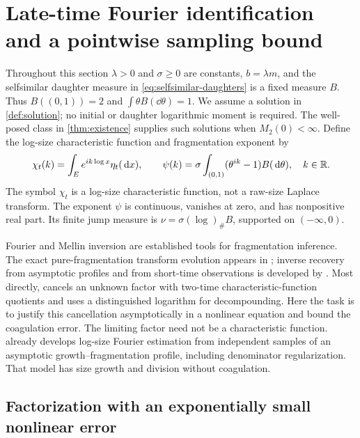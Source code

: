 \section{Late-time Fourier identification and a pointwise sampling bound}
\label{sec:fourier}

Throughout this section $\lambda>0$ and $\sigma\geq0$ are constants,
$b=\lambda m$, and the selfsimilar daughter measure in
\eqref{eq:selfsimilar-daughters} is a fixed measure $B$. Thus
$B((0,1))=2$ and $\int\theta B(\dd\theta)=1$.
We assume a solution in \cref{def:solution}; no initial or daughter
logarithmic moment is required. The well-posed class in
\cref{thm:existence} supplies such solutions when $M_2(0)<\infty$.
Define the log-size characteristic function and fragmentation exponent by
\begin{equation}
 \chi_t(k)=\int_E e^{ik\log x}\eta_t(\,\mathrm d x),\qquad
 \psi(k)=\sigma\int_{(0,1)}(\theta^{ik}-1)B(\,\mathrm d\theta),
 \quad k\in\mathbb R.
 \label{eq:fourier-def}
\end{equation}
The symbol $\chi_t$ is a log-size characteristic function, not a
raw-size Laplace transform.
The exponent $\psi$ is continuous, vanishes at zero, and has nonpositive
real part. Its finite jump measure is
$\nu=\sigma(\log)_\# B$, supported on $(-\infty,0)$.

Fourier and Mellin inversion are established tools for fragmentation
inference. The exact pure-fragmentation transform evolution appears in
\citet[equations (12)--(14)]{DoumicEscobedo2016}; inverse recovery from
asymptotic profiles and from short-time observations is developed by
\citet{DoumicEscobedoTournus2018,DoumicEscobedoTournus2024}.
Most directly, \citet[Section 2.2]{Garnier2024} cancels an unknown factor
with two-time characteristic-function quotients and uses a distinguished
logarithm for decompounding. Here the task is to justify this cancellation
asymptotically in a nonlinear equation and bound the coagulation error.
The limiting factor need not be a characteristic function.
\citet[Sections 3.1.1--3.1.4]{HoangEtAl2022} already develops
log-size Fourier estimation from independent samples of an asymptotic
growth--fragmentation profile, including denominator regularization.
That model has size growth and division without coagulation.

\subsection{Factorization with an exponentially small nonlinear error}

